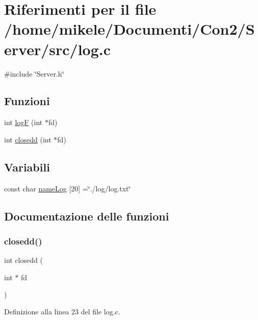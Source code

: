 \hypertarget{a00026}{}\section{Riferimenti per il file /home/mikele/\+Documenti/\+Con2/\+Server/src/log.c}
\label{a00026}
{\ttfamily \#include \char`\"{}Server.\+h\char`\"{}}\newline
\subsection*{Funzioni}
\begin{DoxyCompactItemize}
\item 
int \mbox{\hyperlink{a00026_a1ed8934d63b9109e59342857ed872179}{logF}} (int $\ast$fd)
\item 
int \mbox{\hyperlink{a00026_a56f0cdc565b9dce2bcf5ca3968294ba1}{closedd}} (int $\ast$fd)
\end{DoxyCompactItemize}
\subsection*{Variabili}
\begin{DoxyCompactItemize}
\item 
const char \mbox{\hyperlink{a00026_a85c26d71289737af4273c9c226ebf5f7}{name\+Log}} \mbox{[}20\mbox{]} =\char`\"{}./log/log.\+txt\char`\"{}
\end{DoxyCompactItemize}


\subsection{Documentazione delle funzioni}
\mbox{\label{a00026_a56f0cdc565b9dce2bcf5ca3968294ba1}} 
\subsubsection{\texorpdfstring{closedd()}{closedd()}}
{\footnotesize\ttfamily int closedd (\begin{DoxyParamCaption}\item[{int $\ast$}]{fd }\end{DoxyParamCaption})}



Definizione alla linea 23 del file log.\+c.

